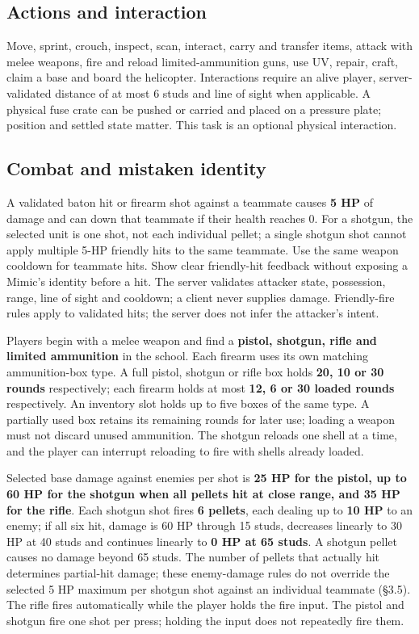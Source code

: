 \subsection{Actions and interaction}
Move, sprint, crouch, inspect, scan, interact, carry and transfer items, attack with melee weapons, fire and reload limited-ammunition guns, use UV, repair, craft, claim a base and board the helicopter. Interactions require an alive player, server-validated distance of at most 6 studs and line of sight when applicable. A physical fuse crate can be pushed or carried and placed on a pressure plate; position and settled state matter. This task is an optional physical interaction.


\subsection{Combat and mistaken identity}
A validated baton hit or firearm shot against a teammate causes \textbf{5 HP} of damage and can down that teammate if their health reaches 0. For a shotgun, the selected unit is one shot, not each individual pellet; a single shotgun shot cannot apply multiple 5-HP friendly hits to the same teammate. Use the same weapon cooldown for teammate hits. Show clear friendly-hit feedback without exposing a Mimic's identity before a hit. The server validates attacker state, possession, range, line of sight and cooldown; a client never supplies damage. Friendly-fire rules apply to validated hits; the server does not infer the attacker's intent.

Players begin with a melee weapon and find a \textbf{pistol, shotgun, rifle and limited ammunition} in the school. Each firearm uses its own matching ammunition-box type. A full pistol, shotgun or rifle box holds \textbf{20, 10 or 30 rounds} respectively; each firearm holds at most \textbf{12, 6 or 30 loaded rounds} respectively. An inventory slot holds up to five boxes of the same type. A partially used box retains its remaining rounds for later use; loading a weapon must not discard unused ammunition. The shotgun reloads one shell at a time, and the player can interrupt reloading to fire with shells already loaded.

Selected base damage against enemies per shot is \textbf{25 HP for the pistol, up to 60 HP for the shotgun when all pellets hit at close range, and 35 HP for the rifle}. Each shotgun shot fires \textbf{6 pellets}, each dealing up to \textbf{10 HP} to an enemy; if all six hit, damage is 60 HP through 15 studs, decreases linearly to 30 HP at 40 studs and continues linearly to \textbf{0 HP at 65 studs}. A shotgun pellet causes no damage beyond 65 studs. The number of pellets that actually hit determines partial-hit damage; these enemy-damage rules do not override the selected 5 HP maximum per shotgun shot against an individual teammate (§3.5). The rifle fires automatically while the player holds the fire input. The pistol and shotgun fire one shot per press; holding the input does not repeatedly fire them.

